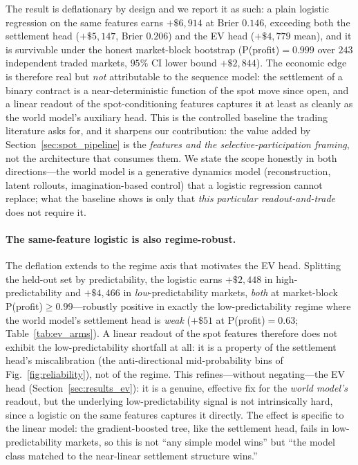 \documentclass{article}
\begin{document}
The result is deflationary by design and we report it as such: a plain
logistic regression on the same features earns $+\$6{,}914$ at Brier $0.146$,
exceeding both the settlement head ($+\$5{,}147$, Brier $0.206$) and the EV
head ($+\$4{,}779$ mean), and it is survivable under the honest market-block
bootstrap (P(profit)$=0.999$ over $243$ independent traded markets, $95\%$
CI lower bound $+\$2{,}844$).  The economic edge is therefore real but
\emph{not} attributable to the sequence model: the settlement of a binary
contract is a near-deterministic function of the spot move since open, and a
linear readout of the spot-conditioning features captures it at least as
cleanly as the world model's auxiliary head.  This is the controlled baseline
the trading literature asks for, and it sharpens our contribution: the value
added by Section~\ref{sec:spot_pipeline} is the \emph{features and the
selective-participation framing}, not the architecture that consumes them.
We state the scope honestly in both directions---the world model is a
generative dynamics model (reconstruction, latent rollouts, imagination-based
control) that a logistic regression cannot replace; what the baseline shows is
only that \emph{this particular readout-and-trade} does not require it.

\paragraph{The same-feature logistic is also regime-robust.}
The deflation extends to the regime axis that motivates the EV head.
Splitting the held-out set by predictability, the logistic earns $+\$2{,}448$
in high-predictability and $+\$4{,}466$ in \emph{low}-predictability markets,
\emph{both} at market-block P(profit)$\ge 0.99$---robustly
positive in exactly the low-predictability regime where the world model's
settlement head is \emph{weak} ($+\$51$ at P(profit)$=0.63$;
Table~\ref{tab:ev_arms}).  A linear readout of the spot features
therefore does not exhibit the low-predictability shortfall at all: it is a
property of the settlement head's miscalibration (the anti-directional
mid-probability bins of Fig.~\ref{fig:reliability}), not of the regime.  This refines---without negating---the EV head
(Section~\ref{sec:results_ev}): it is a genuine, effective fix for the
\emph{world model's} readout, but the underlying low-predictability signal is
not intrinsically hard, since a logistic on the same features captures it
directly.  The effect is specific to the linear model: the gradient-boosted
tree, like the settlement head, fails in low-predictability markets, so this is
not ``any simple model wins'' but ``the model class matched to the near-linear
settlement structure wins.''
\end{document}
